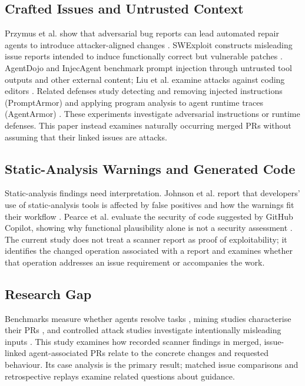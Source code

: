 \documentclass[acmsmall,screen,nonacm]{acmart}
\begin{document}
\subsection{Crafted Issues and Untrusted Context}

Przymus et al. show that adversarial bug reports can lead automated repair agents to introduce attacker-aligned changes \cite{b16}. SWExploit constructs misleading issue reports intended to induce functionally correct but vulnerable patches \cite{b3}. AgentDojo and InjecAgent benchmark prompt injection through untrusted tool outputs and other external content; Liu et al. examine attacks against coding editors \cite{b6,b24,b12}. Related defenses study detecting and removing injected instructions (PromptArmor) and applying program analysis to agent runtime traces (AgentArmor) \cite{b45,b46}. These experiments investigate adversarial instructions or runtime defenses. This paper instead examines naturally occurring merged PRs without assuming that their linked issues are attacks.

\subsection{Static-Analysis Warnings and Generated Code}

Static-analysis findings need interpretation. Johnson et al. report that developers' use of static-analysis tools is affected by false positives and how the warnings fit their workflow \cite{b33}. Pearce et al. evaluate the security of code suggested by GitHub Copilot, showing why functional plausibility alone is not a security assessment \cite{b35}. The current study does not treat a scanner report as proof of exploitability; it identifies the changed operation associated with a report and examines whether that operation addresses an issue requirement or accompanies the work.

\subsection{Research Gap}

Benchmarks measure whether agents resolve tasks \cite{b9,b22}, mining studies characterise their PRs \cite{b11,b21}, and controlled attack studies investigate intentionally misleading inputs \cite{b3,b16}. This study examines how recorded scanner findings in merged, issue-linked agent-associated PRs relate to the concrete changes and requested behaviour. Its case analysis is the primary result; matched issue comparisons and retrospective replays examine related questions about guidance.
\end{document}
